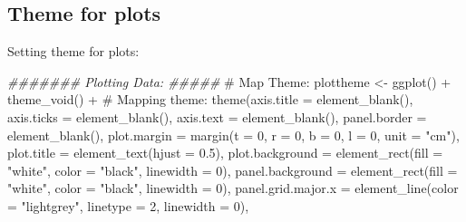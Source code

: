 \documentclass[
  letterpaper,
  DIV=11,
  numbers=noendperiod]{scrartcl}
\newenvironment{Shaded}{\begin{snugshade}}{\end{snugshade}}
\newcommand{\AttributeTok}[1]{\textcolor[rgb]{0.40,0.45,0.13}{#1}}
\newcommand{\CommentTok}[1]{\textcolor[rgb]{0.37,0.37,0.37}{#1}}
\newcommand{\DecValTok}[1]{\textcolor[rgb]{0.68,0.00,0.00}{#1}}
\newcommand{\DocumentationTok}[1]{\textcolor[rgb]{0.37,0.37,0.37}{\textit{#1}}}
\newcommand{\FloatTok}[1]{\textcolor[rgb]{0.68,0.00,0.00}{#1}}
\newcommand{\FunctionTok}[1]{\textcolor[rgb]{0.28,0.35,0.67}{#1}}
\newcommand{\NormalTok}[1]{\textcolor[rgb]{0.00,0.23,0.31}{#1}}
\newcommand{\OtherTok}[1]{\textcolor[rgb]{0.00,0.23,0.31}{#1}}
\newcommand{\SpecialCharTok}[1]{\textcolor[rgb]{0.37,0.37,0.37}{#1}}
\newcommand{\StringTok}[1]{\textcolor[rgb]{0.13,0.47,0.30}{#1}}
\begin{document}
\subsection{Theme for plots}\label{theme-for-plots}

Setting theme for plots:

\begin{Shaded}
\begin{Highlighting}[]
\DocumentationTok{\#\#\#\#\#\#\# Plotting Data: \#\#\#\#\#}
\CommentTok{\# Map Theme:}
\NormalTok{plottheme }\OtherTok{\textless{}{-}} \FunctionTok{ggplot}\NormalTok{() }\SpecialCharTok{+}
  \FunctionTok{theme\_void}\NormalTok{() }\SpecialCharTok{+}
  \CommentTok{\# Mapping theme:}
  \FunctionTok{theme}\NormalTok{(}\AttributeTok{axis.title =} \FunctionTok{element\_blank}\NormalTok{(),}
        \AttributeTok{axis.ticks =} \FunctionTok{element\_blank}\NormalTok{(),}
        \AttributeTok{axis.text =} \FunctionTok{element\_blank}\NormalTok{(),}
        \AttributeTok{panel.border =} \FunctionTok{element\_blank}\NormalTok{(),}
        \AttributeTok{plot.margin =} \FunctionTok{margin}\NormalTok{(}\AttributeTok{t =} \DecValTok{0}\NormalTok{, }
                             \AttributeTok{r =} \DecValTok{0}\NormalTok{, }
                             \AttributeTok{b =} \DecValTok{0}\NormalTok{, }
                             \AttributeTok{l =} \DecValTok{0}\NormalTok{, }
                             \AttributeTok{unit =} \StringTok{"cm"}\NormalTok{),}
        \AttributeTok{plot.title =} \FunctionTok{element\_text}\NormalTok{(}\AttributeTok{hjust =} \FloatTok{0.5}\NormalTok{),}
        \AttributeTok{plot.background =} \FunctionTok{element\_rect}\NormalTok{(}\AttributeTok{fill =} \StringTok{"white"}\NormalTok{, }
                                       \AttributeTok{color =} \StringTok{"black"}\NormalTok{,}
                                       \AttributeTok{linewidth =} \DecValTok{0}\NormalTok{),}
        \AttributeTok{panel.background =} \FunctionTok{element\_rect}\NormalTok{(}\AttributeTok{fill =} \StringTok{"white"}\NormalTok{, }
                                        \AttributeTok{color =} \StringTok{"black"}\NormalTok{,}
                                        \AttributeTok{linewidth =} \DecValTok{0}\NormalTok{),}
        \AttributeTok{panel.grid.major.x =} \FunctionTok{element\_line}\NormalTok{(}\AttributeTok{color =} \StringTok{"lightgrey"}\NormalTok{,}
                                          \AttributeTok{linetype =} \DecValTok{2}\NormalTok{,}
                                          \AttributeTok{linewidth =} \DecValTok{0}\NormalTok{),}

\end{Highlighting}
\end{Shaded}
\end{document}
